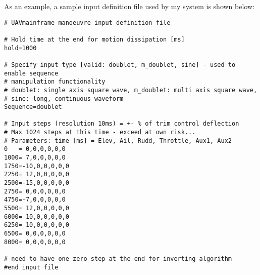 \documentclass[11pt,a4paper]{article}
\begin{document}
As an example, a sample input definition file used by my system is shown below:

\begin{verbatim}
# UAVmainframe manoeuvre input definition file

# Hold time at the end for motion dissipation [ms]
hold=1000

# Specify input type [valid: doublet, m_doublet, sine] - used to enable sequence 
# manipulation functionality
# doublet: single axis square wave, m_doublet: multi axis square wave, 
# sine: long, continuous waveform
Sequence=doublet

# Input steps (resolution 10ms) = +- % of trim control deflection  
# Max 1024 steps at this time - exceed at own risk...
# Parameters: time [ms] = Elev, Ail, Rudd, Throttle, Aux1, Aux2
0   = 0,0,0,0,0,0
1000= 7,0,0,0,0,0
1750=-10,0,0,0,0,0
2250= 12,0,0,0,0,0
2500=-15,0,0,0,0,0
2750= 0,0,0,0,0,0
4750=-7,0,0,0,0,0
5500= 12,0,0,0,0,0
6000=-10,0,0,0,0,0
6250= 10,0,0,0,0,0
6500= 0,0,0,0,0,0
8000= 0,0,0,0,0,0

# need to have one zero step at the end for inverting algorithm
#end input file
\end{verbatim}
\end{document}
